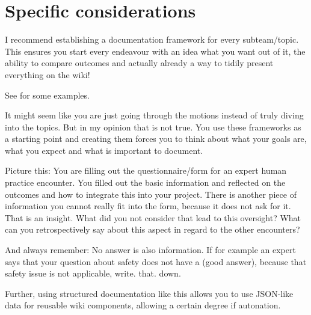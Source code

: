 \section{Specific considerations} \label{sec:specific-considerations}
I recommend establishing a documentation framework for every subteam/topic.
This ensures you start every endeavour with an idea what you want out of it, the ability to compare outcomes and
actually already a way to tidily present everything on the wiki!

See  for some examples.

It might seem like you are just going through the motions instead of truly diving into the topics.
But in my opinion that is not true.
You use these frameworks as a starting point and creating them forces you to think about what your goals are, what
you expect and what is important to document.

Picture this: You are filling out the questionnaire/form for an expert human practice encounter.
You filled out the basic information and reflected on the outcomes and how to integrate this into your project.
There is another piece of information you cannot really fit into the form, because it does not ask for it.
That is an insight.
What did you not consider that lead to this oversight?
What can you retrospectively say about this aspect in regard to the other encounters?

And always remember: No answer is also information.
If for example an expert says that your question about safety does not have a (good answer), because that safety
issue is not applicable, write.
that.
down.


Further, using structured documentation like this allows you to use JSON-like data for reusable wiki components,
allowing a certain degree if autonation.

